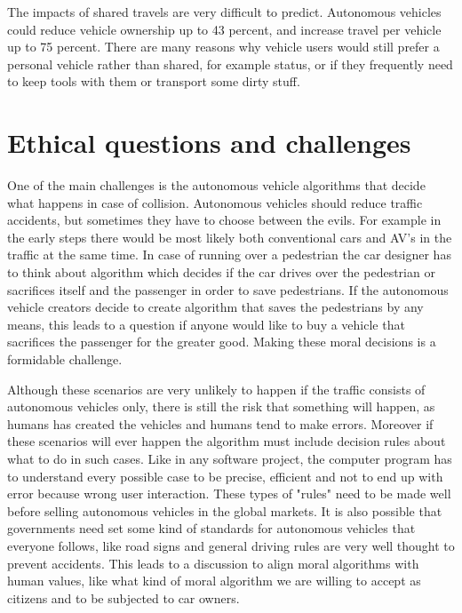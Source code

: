 \documentclass[english]{tktltiki}
\begin{document}
The impacts of shared travels are very 
difficult to predict. Autonomous vehicles could reduce vehicle ownership up to 
43 percent, and increase travel per vehicle up to 75 percent. 
\cite{transportpolicy} There are many reasons why vehicle users would still 
prefer a personal vehicle rather than shared, for example status, or if they 
frequently need to keep tools with them or transport some dirty stuff.


\section{Ethical questions and challenges}
One of the main challenges is the autonomous vehicle algorithms that decide what 
happens in case of collision. \cite{dilemma} Autonomous vehicles should reduce 
traffic accidents, but sometimes they have to choose between the evils. For 
example in the early steps there would be most likely both conventional cars and 
AV's in the traffic at the same time. In case of running over a pedestrian the 
car designer has to think about algorithm which decides if the car drives over 
the pedestrian or sacrifices itself and the passenger in order to save 
pedestrians. If the autonomous vehicle creators decide to create algorithm that 
saves the pedestrians by any means, this leads to a question if anyone would 
like to buy a vehicle that sacrifices the passenger for the greater good. Making 
these moral decisions is a formidable challenge.

Although these scenarios are very unlikely to happen if the traffic consists of 
autonomous vehicles only, there is still the risk that something will happen, as 
humans has created the vehicles and humans tend to make errors. Moreover if 
these scenarios will ever happen the algorithm must include decision rules about 
what to do in such cases. \cite{dilemma} Like in any software project, the 
computer program has to understand every possible case to be precise, efficient 
and not to end up with error because wrong user interaction. These types of 
"rules" need to be made well before selling autonomous vehicles in the global 
markets. It is also possible that governments need set some kind of standards 
for autonomous vehicles that everyone follows, like road signs and general 
driving  rules are very well thought to prevent accidents. This leads to a 
discussion to align moral algorithms with human values, like what kind of moral 
algorithm we are willing to accept as citizens and to be subjected to car 
owners. 
\end{document}
